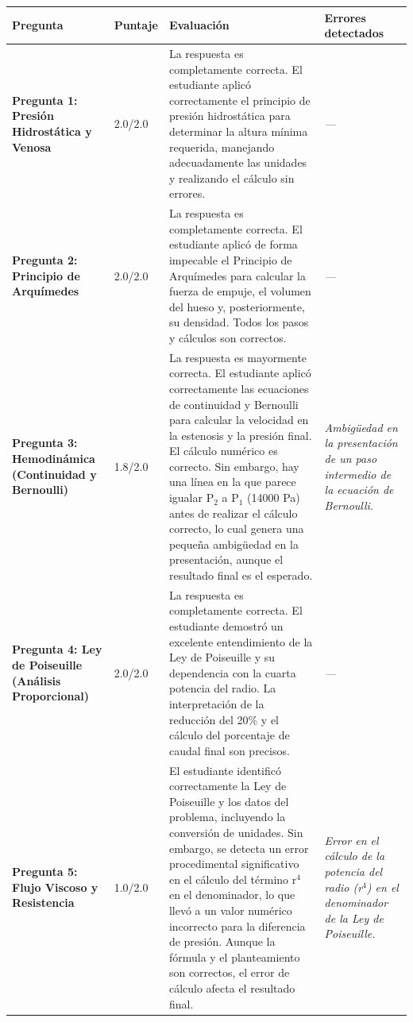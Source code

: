 \documentclass[11pt,a4paper]{article}
\begin{document}
\begin{longtable}{>{\bfseries}p{2.8cm} p{1.6cm} p{7.0cm} p{2.8cm}}
  \toprule
  \textbf{Pregunta} & \textbf{Puntaje} & \textbf{Evaluación} & \textbf{Errores detectados} \\
  \midrule
  \endhead
  \bottomrule
  \endfoot
    \textbf{Pregunta 1: Presión Hidrostática y Venosa} & 2.0/2.0 & La respuesta es completamente correcta. El estudiante aplicó correctamente el principio de presión hidrostática para determinar la altura mínima requerida, manejando adecuadamente las unidades y realizando el cálculo sin errores. & \textit{---} \\
    \midrule
    \textbf{Pregunta 2: Principio de Arquímedes} & 2.0/2.0 & La respuesta es completamente correcta. El estudiante aplicó de forma impecable el Principio de Arquímedes para calcular la fuerza de empuje, el volumen del hueso y, posteriormente, su densidad. Todos los pasos y cálculos son correctos. & \textit{---} \\
    \midrule
    \textbf{Pregunta 3: Hemodinámica (Continuidad y Bernoulli)} & 1.8/2.0 & La respuesta es mayormente correcta. El estudiante aplicó correctamente las ecuaciones de continuidad y Bernoulli para calcular la velocidad en la estenosis y la presión final. El cálculo numérico es correcto. Sin embargo, hay una línea en la que parece igualar P$_{2}$ a P$_{1}$ (14000 Pa) antes de realizar el cálculo correcto, lo cual genera una pequeña ambigüedad en la presentación, aunque el resultado final es el esperado. & \textit{Ambigüedad en la presentación de un paso intermedio de la ecuación de Bernoulli.} \\
    \midrule
    \textbf{Pregunta 4: Ley de Poiseuille (Análisis Proporcional)} & 2.0/2.0 & La respuesta es completamente correcta. El estudiante demostró un excelente entendimiento de la Ley de Poiseuille y su dependencia con la cuarta potencia del radio. La interpretación de la reducción del 20\% y el cálculo del porcentaje de caudal final son precisos. & \textit{---} \\
    \midrule
    \textbf{Pregunta 5: Flujo Viscoso y Resistencia} & 1.0/2.0 & El estudiante identificó correctamente la Ley de Poiseuille y los datos del problema, incluyendo la conversión de unidades. Sin embargo, se detecta un error procedimental significativo en el cálculo del término r$^{4}$ en el denominador, lo que llevó a un valor numérico incorrecto para la diferencia de presión. Aunque la fórmula y el planteamiento son correctos, el error de cálculo afecta el resultado final. & \textit{Error en el cálculo de la potencia del radio (r$^{4}$) en el denominador de la Ley de Poiseuille.} \\
    \midrule
\end{longtable}
\end{document}
